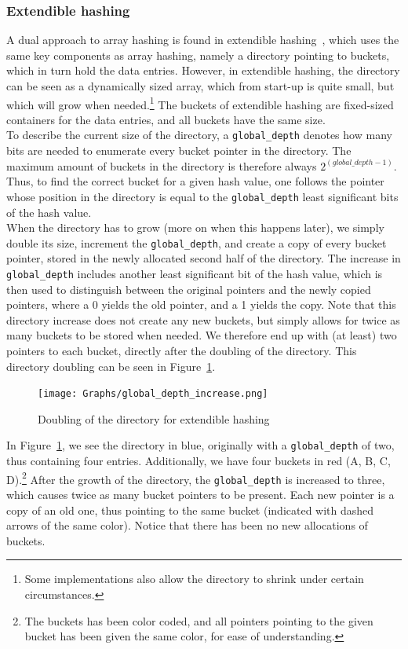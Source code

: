 \documentclass[11pt]{article} %
\begin{document}
\subsubsection{Extendible hashing}
\label{subsubsec:background_extendible_hashing}
A dual approach to array hashing is found in extendible hashing~\cite{dms03}, which uses the same key components as array hashing, namely a directory pointing to buckets, which in turn hold the data entries. However, in extendible hashing, the directory can be seen as a dynamically sized array, which from start-up is quite small, but which will grow when needed.\footnote{Some implementations also allow the directory to shrink under certain circumstances.} The buckets of extendible hashing are fixed-sized containers for the data entries, and all buckets have the same size. \\

To describe the current size of the directory, a \verb|global_depth| denotes how many bits are needed to enumerate every bucket pointer in the directory. The maximum amount of buckets in the directory is therefore always $2^{(global\_depth-1)}$. Thus, to find the correct bucket for a given hash value, one follows the pointer whose position in the directory is equal to the \verb|global_depth| least significant bits of the hash value.\\

When the directory has to grow (more on when this happens later), we simply double its size, increment the \verb|global_depth|, and create a copy of every bucket pointer, stored in the newly allocated second half of the directory. The increase in \verb|global_depth| includes another least significant bit of the hash value, which is then used to distinguish between the original pointers and the newly copied pointers, where a 0 yields the old pointer, and a 1 yields the copy. Note that this directory increase does not create any new buckets, but simply allows for twice as many buckets to be stored when needed. We therefore end up with (at least) two pointers to each bucket, directly after the doubling of the directory. This directory doubling can be seen in Figure~\ref{fig:global_depth_increase}.\\

\begin{figure}[H]
  \centering
  \texttt{[image: Graphs/global\_depth\_increase.png]}
  \caption{Doubling of the directory for extendible hashing}
  \label{fig:global_depth_increase}
\end{figure}
In Figure~\ref{fig:global_depth_increase}, we see the directory in blue, originally with a \verb|global_depth| of two, thus containing four entries. Additionally, we have four buckets in red (A, B, C, D).\footnote{The buckets has been color coded, and all pointers pointing to the given bucket has been given the same color, for ease of understanding.} After the growth of the directory, the \verb|global_depth| is increased to three, which causes twice as many bucket pointers to be present. Each new pointer is a copy of an old one, thus pointing to the same bucket (indicated with dashed arrows of the same color). Notice that there has been no new allocations of buckets.\\
\end{document}
